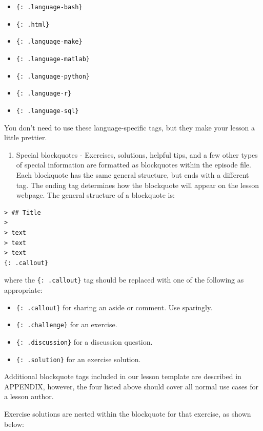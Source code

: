 \documentclass[
]{book}
\providecommand{\tightlist}{%
  \setlength{\itemsep}{0pt}\setlength{\parskip}{0pt}}
\begin{document}
\begin{itemize}
\tightlist
\item
  \texttt{\{:\ .language-bash\}}
\item
  \texttt{\{:\ .html\}}
\item
  \texttt{\{:\ .language-make\}}
\item
  \texttt{\{:\ .language-matlab\}}
\item
  \texttt{\{:\ .language-python\}}
\item
  \texttt{\{:\ .language-r\}}
\item
  \texttt{\{:\ .language-sql\}}
\end{itemize}

You don't need to use these language-specific tags, but they make your lesson a little prettier.

\begin{enumerate}
\def\labelenumi{\arabic{enumi}.}
\tightlist
\item
  Special blockquotes - Exercises, solutions, helpful tips, and a few other types of special information are
  formatted as blockquotes within the episode file. Each blockquote has the same general structure, but ends
  with a different tag. The ending tag determines how the blockquote will appear on the lesson webpage. The
  general structure of a blockquote is:
\end{enumerate}

\begin{verbatim}
> ## Title
>
> text
> text
> text
{: .callout}
\end{verbatim}

where the \texttt{\{:\ .callout\}} tag should be replaced with one of the following as appropriate:

\begin{itemize}
\tightlist
\item
  \texttt{\{:\ .callout\}} for sharing an aside or comment. Use sparingly.
\item
  \texttt{\{:\ .challenge\}} for an exercise.
\item
  \texttt{\{:\ .discussion\}} for a discussion question.
\item
  \texttt{\{:\ .solution\}} for an exercise solution.
\end{itemize}

Additional blockquote tags included in our lesson template are described in APPENDIX, however, the four listed
above should cover all normal use cases for a lesson author.

Exercise solutions are nested within the blockquote for that exercise, as shown below:
\end{document}
